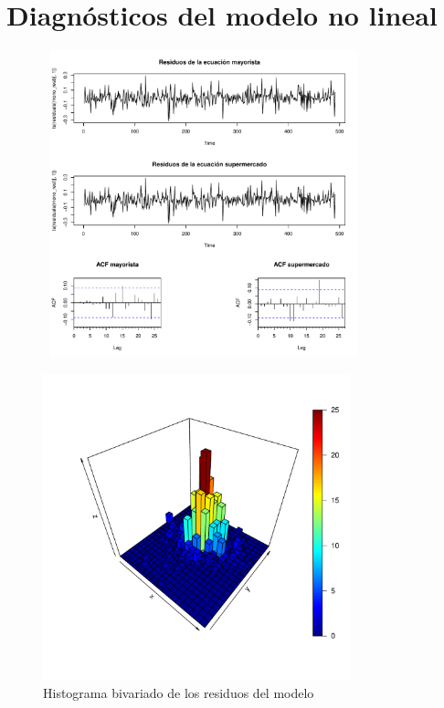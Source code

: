 \documentclass[12pt, twoside]{book}\usepackage[]{graphicx}\usepackage[]{color}
\newenvironment{knitrout}{}{} %
\numberwithin{equation}{section}
\numberwithin{theorem}{section}
\numberwithin{teorema}{section}
\numberwithin{defi}{section}
\numberwithin{prop}{section}
\numberwithin{defi}{section}
\theoremstyle{plain}
\begin{document}
\section{Diagnósticos del modelo no lineal}


\begin{knitrout}
\color{fgcolor}

{\centering \includegraphics[width=4.5in,height=3.5in]{figure/unnamed-chunk-26-1} 

}



\end{knitrout}


\begin{knitrout}
\color{fgcolor}\begin{figure}[H]

{\centering \includegraphics[width=3.5in,height=3.5in]{figure/fig-5_11-1} 

}

\caption[Histograma bivariado de los residuos del modelo]{Histograma bivariado de los residuos del modelo}\label{fig:fig-5.11}
\end{figure}


\end{knitrout}
\end{document}
